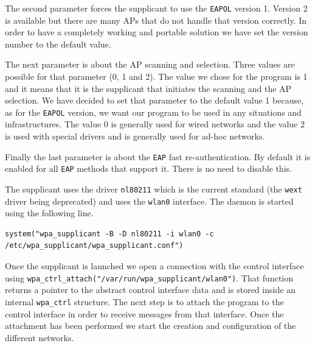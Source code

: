 The second parameter forces the supplicant to use the \texttt{EAPOL} version 1. Version 2 is available but there are many APs that do not handle that version correctly. In order to have a completely working and portable solution we have set the version number to the default value.

The next parameter is about the AP scanning and selection. Three values are possible for that parameter (0, 1 and 2). The value we chose for the program is 1 and it means that it is the supplicant that initiates the scanning and the AP selection. We have decided to set that parameter to the default value 1 because, as for the \texttt{EAPOL} version, we want our program to be used in any situations and infrastructures. The value 0 is generally used for wired networks and the value 2 is used with special drivers and is generally used for ad-hoc networks.

Finally the last parameter is about the \texttt{EAP} fast re-authentication. By default it is enabled for all \texttt{EAP} methods that support it. There is no need to disable this.


The supplicant uses the driver \texttt{nl80211} which is the current standard (the \texttt{wext} driver being deprecated) and uses the \texttt{wlan0} interface. The daemon is started using the following line.\\

\begin{lstlisting}[frame=single,breaklines=true,caption={Starting the \texttt{wpa\_supplicant} daemon}]
system("wpa_supplicant -B -D nl80211 -i wlan0 -c /etc/wpa_supplicant/wpa_supplicant.conf")
\end{lstlisting}

Once the supplicant is launched we open a connection with the control interface using \texttt{wpa\_ctrl\_attach("/var/run/wpa\_supplicant/wlan0")}. That function returns a pointer to the abstract control interface data and is stored inside an internal \texttt{wpa\_ctrl} structure. The next step is to attach the program to the control interface in order to receive messages from that interface. Once the attachment has been performed we start the creation and configuration of the different networks.

